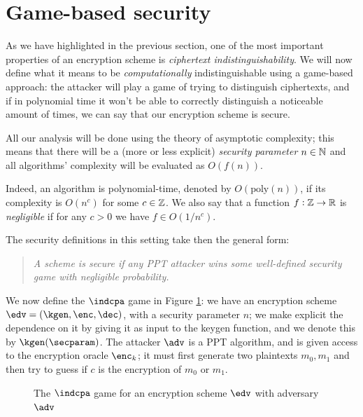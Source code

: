 \section{Game-based security}
As we have highlighted in the previous section, one of the most important properties of an encryption scheme is \emph{ciphertext indistinguishability}. We will now define what it means to be \emph{computationally} indistinguishable using a game-based approach: the attacker will play a game of trying to distinguish ciphertexts, and if in polynomial time it won't be able to correctly distinguish a noticeable amount of times, we can say that our encryption scheme is secure.

All our analysis will be done using the theory of asymptotic complexity; this means that there will be a (more or less explicit) \emph{security parameter} $n\in\mathbb{N}$ and all algorithms' complexity will be evaluated as $O(f(n))$.

Indeed, an algorithm is polynomial-time, denoted by $O(\text{poly}(n))$, if its complexity is $O(n^c)$ for some $c\in\mathbb{Z}$. We also say that a function $f:\mathbb{Z}\to\mathbb{R}$ is \emph{negligible} if for any $c>0$ we have $f\in O(1/n^c)$.

The security definitions in this setting take then the general form:

\begin{quote}
    \textit{A scheme is \emph{secure} if any PPT attacker wins some well-defined security game with negligible probability.}
\end{quote}

We now define the $\indcpa$ game in Figure \ref{game_indcpa}: we have an encryption scheme $\edv=(\kgen,\enc,\dec)$, with a security parameter $n$; we make explicit the dependence on it by giving it as input to the keygen function, and we denote this by $\kgen(\secparam)$. The attacker $\adv$ is a PPT algorithm, and is given access to the encryption oracle $\enc_k$; it must first generate two plaintexts $m_0,m_1$ and then try to guess if $c$ is the encryption of $m_0$ or $m_1$.

\begin{figure}
    \caption{The $\indcpa$ game for an encryption scheme $\edv$ with adversary $\adv$}
    \label{game_indcpa}
\end{figure}


